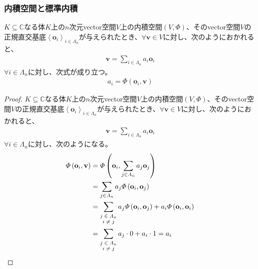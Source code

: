 \documentclass[dvipdfmx]{jsarticle}
\begin{document}
\subsubsection{内積空間と標準内積}%
\begin{thm}\label{2.3.6.17}
$K \subseteq \mathbb{C}$なる体$K$上の$n$次元vector空間$V$上の内積空間$(V,\varPhi)$、そのvector空間$V$の正規直交基底$\left\langle \mathbf{o}_{i} \right\rangle_{i \in \varLambda_{n}}$が与えられたとき、$\forall\mathbf{v} \in V$に対し、次のようにおかれると、
\begin{align*}
\mathbf{v} = \sum_{i \in \varLambda_{n}} {a_{i}\mathbf{o}_{i}}
\end{align*}
$\forall i \in \varLambda_{n}$に対し、次式が成り立つ。
\begin{align*}
a_{i} = \varPhi\left( \mathbf{o}_{i},\mathbf{v} \right)
\end{align*}
\end{thm}
\begin{proof}
$K \subseteq \mathbb{C}$なる体$K$上の$n$次元vector空間$V$上の内積空間$(V,\varPhi)$、そのvector空間$V$の正規直交基底$\left\langle \mathbf{o}_{i} \right\rangle_{i \in \varLambda_{n}}$が与えられたとき、$\forall\mathbf{v} \in V$に対し、次のようにおかれると、
\begin{align*}
\mathbf{v} = \sum_{i \in \varLambda_{n}} {a_{i}\mathbf{o}_{i}}
\end{align*}
$\forall i \in \varLambda_{n}$に対し、次のようになる。
\begin{align*}
\varPhi\left( \mathbf{o}_{i},\mathbf{v} \right) &= \varPhi\left( \mathbf{o}_{i},\sum_{j \in \varLambda_{n}} {a_{j}\mathbf{o}_{j}} \right)\\
&= \sum_{j \in \varLambda_{n}} {a_{j}\varPhi\left( \mathbf{o}_{i},\mathbf{o}_{j} \right)}\\
&= \sum_{\scriptsize \begin{matrix} j \in \varLambda_{n}\\i \neq j\\\end{matrix}} {a_{j}\varPhi\left( \mathbf{o}_{i},\mathbf{o}_{j} \right)} + a_{i}\varPhi\left( \mathbf{o}_{i},\mathbf{o}_{i} \right)\\
&= \sum_{\scriptsize \begin{matrix} j \in \varLambda_{n}\\i \neq j\\\end{matrix}} {a_{j} \cdot 0} + a_{i} \cdot 1 = a_{i}
\end{align*}
\end{proof}
\end{document}

